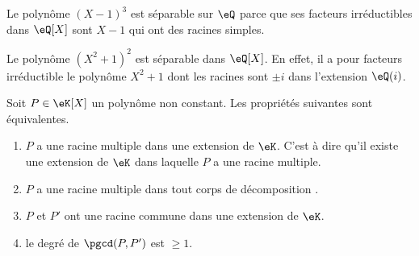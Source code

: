 \begin{example}
    Le polynôme \( (X-1)^3\) est séparable sur \( \eQ\) parce que ses facteurs irréductibles dans \( \eQ[X]\) sont \( X-1\) qui ont des racines simples.
\end{example}

\begin{example}
    Le polynôme \( (X^2+1)^2\) est séparable dans \( \eQ[X]\). En effet, il a pour facteurs irréductible le polynôme \( X^2+1\) dont les racines sont \( \pm i\) dans l'extension \( \eQ(i)\).
\end{example}

\begin{proposition}  \label{PropolyeZff}
    Soit \( P\in \eK[X]\) un polynôme non constant. Les propriétés suivantes sont équivalentes.
    \begin{enumerate}
        \item\label{ItemdqPFUi}
            \( P\) a une racine multiple dans une extension de \( \eK\). C'est à dire qu'il existe une extension de \( \eK\) dans laquelle \( P\) a une racine multiple.
        \item\label{ItemdqPFUib}
            \( P\) a une racine multiple dans tout corps de décomposition .
        \item\label{ItemdqPFUii}
            \( P\) et \( P'\) ont une racine commune dans une extension de \( \eK\).
        \item\label{ItemdqPFUiii}
            le degré de \( \pgcd(P,P')\) est \( \geq 1\).
    \end{enumerate}
\end{proposition}

